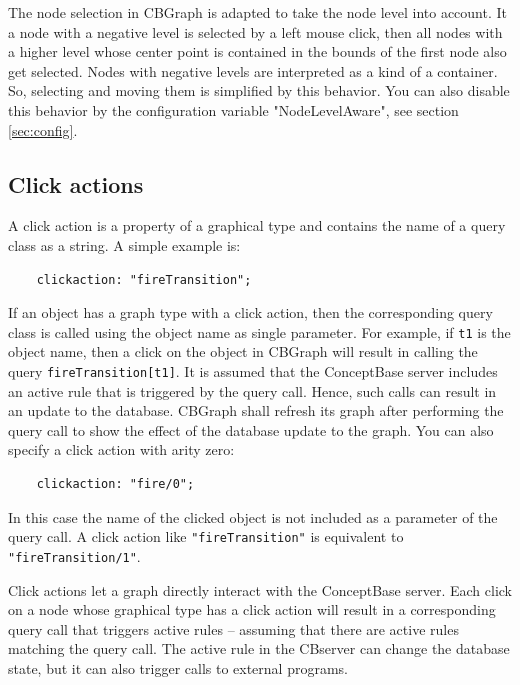 The node selection in CBGraph is adapted to take the node level into account. It a node
with a negative level is selected by a left mouse click, then all nodes with a higher level
whose center point is contained in the bounds of the first node also get selected. Nodes with
negative levels are interpreted as a kind of a container. So, selecting and moving them
is simplified by this behavior. You can also disable this behavior by the configuration
variable "NodeLevelAware", see section \ref{sec:config}.





\subsection{Click actions}
\label{sec:clickactions}

A click action is a property of a graphical type and contains 
the name of a query class as a string. A simple example is:

{\small
\begin{verbatim}
    clickaction: "fireTransition";
\end{verbatim}
}

If an object has a graph type with a click action, then the corresponding query class
is called using the object name as single parameter. For example, if {\tt t1} is the
object name, then a click on the object in CBGraph will result in calling the query
{\tt fireTransition[t1]}. It is assumed that the ConceptBase server includes an
active rule that is triggered by the query call. Hence, such calls can result in an
update to the database.
CBGraph shall refresh its graph after performing the query call to show the effect
of the database update to the graph.
You can also specify a click action with arity zero:

{\small
\begin{verbatim}
    clickaction: "fire/0";
\end{verbatim}
}
In this case the name of the clicked object is not included as a parameter of the query call.
A click action like {\tt "fireTransition"} is equivalent to {\tt "fireTransition/1"}.

Click actions let a graph directly interact with the ConceptBase server. Each click
on a node whose graphical type has a click action will result in a corresponding query
call that triggers active rules -- assuming that there are active rules matching the
query call. The active rule in the CBserver can change the database state, but it
can also trigger calls to external programs.


